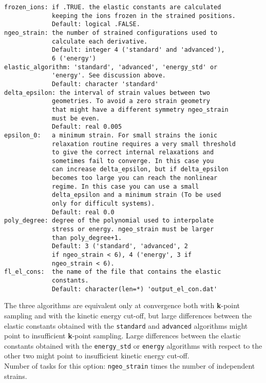 \documentclass[12pt,a4paper,twoside]{report}
\begin{document}
\begin{verbatim}
frozen_ions: if .TRUE. the elastic constants are calculated 
             keeping the ions frozen in the strained positions. 
             Default: logical .FALSE.
ngeo_strain: the number of strained configurations used to 
             calculate each derivative. 
             Default: integer 4 ('standard' and 'advanced'), 
             6 ('energy')
elastic_algorithm: 'standard', 'advanced', 'energy_std' or 
             'energy'. See discussion above.
             Default: character 'standard' 
delta_epsilon: the interval of strain values between two 
             geometries. To avoid a zero strain geometry 
             that might have a different symmetry ngeo_strain 
             must be even.
             Default: real 0.005
epsilon_0:   a minimum strain. For small strains the ionic 
             relaxation routine requires a very small threshold 
             to give the correct internal relaxations and 
             sometimes fail to converge. In this case you 
             can increase delta_epsilon, but if delta_epsilon 
             becomes too large you can reach the nonlinear 
             regime. In this case you can use a small 
             delta_epsilon and a minimum strain (To be used 
             only for difficult systems).
             Default: real 0.0
poly_degree: degree of the polynomial used to interpolate 
             stress or energy. ngeo_strain must be larger 
             than poly_degree+1.
             Default: 3 ('standard', 'advanced', 2 
             if ngeo_strain < 6), 4 ('energy', 3 if 
             ngeo_strain < 6).
fl_el_cons:  the name of the file that contains the elastic 
             constants.
             Default: character(len=*) 'output_el_con.dat'
\end{verbatim}

The three algorithms are equivalent only at convergence both with
{\bf k}-point sampling and with the kinetic energy cut-off, but 
large differences between the elastic constants obtained with the 
\texttt{standard} and \texttt{advanced} algorithms might point to 
insufficient {\bf k}-point sampling. Large differences between the 
elastic constants obtained with the \texttt{energy\_std} or \texttt{energy}
algorithms with respect 
to the other two might point to insufficient kinetic energy cut-off. \\
Number of tasks for this option: \texttt{ngeo\_strain} times the number of
independent strains. \\
\end{document}
